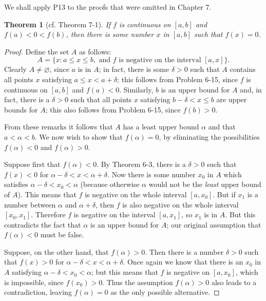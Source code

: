 \documentclass{article}
\numberwithin{definition}{subsection}
\numberwithin{lemma}{subsection}
\numberwithin{theorem}{subsection}
\newtheorem*{theorem*}{Theorem}
\begin{document}
We shall apply P13 to the proofs that were omitted in Chapter 7.

\begin{theorem*}[cf. Theorem 7-1]
  If $f$ is continuous on $[a, b]$ and $f(a) < 0 < f(b)$, then there is some
  number $x$ in $[a, b]$ such that $f(x) = 0$.
\end{theorem*}
\begin{proof}
  Define the set $A$ as follows: \[
    A = \{x : a \leq x \leq b, \text{ and } f \text{ is negative on the interval
      } [a, x]\}.
  \] Clearly $A \neq \varnothing$, since $a$ is in $A$; in fact, there is some
  $\delta > 0$ such that $A$ contains all points $x$ satisfying $a \leq x < a +
  \delta$; this follows from Problem 6-15, since $f$ is continuous on $[a, b]$
  and $f(a) < 0$. Similarly, $b$ is an upper bound for $A$ and, in fact, there
  is a $\delta > 0$ such that all points $x$ satisfying $b - \delta < x \leq b$
  are upper bounds for $A$; this also follows from Problem 6-15, since $f(b) >
  0$.

  From these remarks it follows that $A$ has a least upper bound $\alpha$ and
  that $a < \alpha < b$. We now wish to show that $f(\alpha) = 0$, by
  eliminating the possibilities $f(\alpha) < 0$ and $f(\alpha) > 0$.

  Suppose first that $f(\alpha) < 0$. By Theorem 6-3, there is a $\delta > 0$
  such that $f(x) < 0$ for $\alpha - \delta < x < \alpha + \delta$. Now there is
  some number $x_0$ in $A$ which satisfies $\alpha - \delta < x_0 < \alpha$
  (because otherwise $\alpha$ would not be the \emph{least} upper bound of $A$).
  This means that $f$ is negative on the whole interval $[a, x_0]$. But if $x_1$
  is a number between $\alpha$ and $\alpha + \delta$, then $f$ is also negative
  on the whole interval $[x_0, x_1]$. Therefore $f$ is negative on the interval
  $[a, x_1]$, so $x_1$ is in $A$. But this contradicts the fact that $\alpha$ is
  an upper bound for $A$; our original assumption that $f(\alpha) < 0$ must be
  false.

  Suppose, on the other hand, that $f(\alpha) > 0$. Then there is a number
  $\delta > 0$ such that $f(x) > 0$ for $\alpha - \delta < x < \alpha + \delta$.
  Once again we know that there is an $x_0$ in $A$ satisfying $\alpha - \delta <
  x_0 < \alpha$; but this means that $f$ is negative on $[a, x_0]$, which is
  impossible, since $f(x_0) > 0$. Thus the assumption $f(\alpha) > 0$ also leads
  to a contradiction, leaving $f(\alpha) = 0$ as the only possible alternative.
\end{proof}
\end{document}
